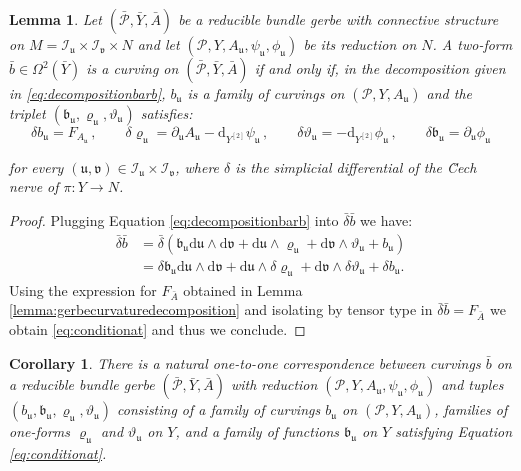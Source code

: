 \documentclass[10pt,a4paper,twoside,reqno]{amsart}
\theoremstyle{plain}
\newtheorem{lemma}[thm]{Lemma}
\newtheorem{cor}[thm]{Corollary}
\theoremstyle{definition}
\theoremstyle{remark}
\def\dd{\mathrm{d}}
\def\cI{\mathcal{I}}
\def\cP{\mathcal{P}}
\def\cP{\mathcal{P}}
\def\dd{\mathrm{d}}
\def\fru{\mathfrak{u}}
\def\frv{\mathfrak{v}}
\begin{document}
\begin{lemma}
\label{lemma:reduciblegerbe}
Let $(\bar{\cP},\bar{Y},\bar{A})$ be a reducible bundle gerbe with connective structure on $M = \cI_{\fru}\times \cI_{\frv} \times N$ and let  $(\cP,Y,A_{\fru} , \psi_{\fru} , \phi_{\fru})$ be its reduction on $N$. A two-form $\bar{b}\in \Omega^2(\bar{Y})$ is a curving on $(\bar{\cP},\bar{Y},\bar{A})$ if and only if, in the decomposition given in \eqref{eq:decompositionbarb}, $b_{\fru}$ is a family of curvings on $(\cP,Y,A_{\fru})$ and the triplet $(\mathfrak{b}_{\fru}, \varrho_{\fru}, \vartheta_{\fru})$  satisfies:
\begin{equation}
\label{eq:conditionat}
\delta b_{\fru} = F_{A_{\fru}}\, , \qquad \delta \varrho_{\fru} = \partial_{\fru} A_{\fru} - \dd_{Y^{[2]}} \psi_{\fru}\, , \qquad \delta \vartheta_{\fru} = - \dd_{Y^{[2]}}\phi_{\fru}\, , \qquad  \delta \mathfrak{b}_{\fru} =  \partial_{\fru} \phi_{\fru}
\end{equation}

\noindent
for every $(\fru , \frv)\in \cI_{\fru} \times \cI_{\frv}$, where $\delta$ is the simplicial differential of the \u{C}ech nerve of $\pi \colon Y \to N$.
\end{lemma}

\begin{proof}
Plugging Equation \eqref{eq:decompositionbarb} into $\bar{\delta}\bar{b}$ we have:
\begin{align*}
\bar{\delta}\bar{b} &= \bar{\delta}( \mathfrak{b}_{\fru} \dd \fru \wedge \dd \frv + \dd \fru \wedge \varrho_{\fru} + \dd \frv \wedge \vartheta_{\fru}   + b_{\fru}) \\
&= \delta\mathfrak{b}_{\fru} \dd \fru \wedge \dd \frv + \dd \fru \wedge \delta \varrho_{\fru} + \dd \frv \wedge \delta \vartheta_{\fru}   + \delta b_{\fru}.
\end{align*}
Using the expression for $F_{\bar{A}}$ obtained in Lemma \ref{lemma:gerbecurvaturedecomposition} and isolating by tensor type in $\bar{\delta}\bar{b}=F_{\bar{A}}$ we obtain \eqref{eq:conditionat} and thus we conclude.
\end{proof}

\begin{cor}
\label{cor:curvingreduction}
There is a natural one-to-one correspondence between curvings $\bar{b}$ on a reducible bundle gerbe $(\bar{\cP},\bar{Y},\bar{A})$ with reduction $(\cP,Y,A_{\fru} , \psi_{\fru} , \phi_{\fru})$ and tuples $(b_{\fru}, \mathfrak{b}_{\fru}, \varrho_{\fru}, \vartheta_{\fru})$ consisting of a family of curvings $b_{\fru}$ on $(\cP,Y,A_{\fru})$, families of one-forms $\varrho_{\fru}$ and $\vartheta_{\fru}$ on $Y$, and a family of functions $\mathfrak{b}_{\fru}$ on $Y$ satisfying Equation \eqref{eq:conditionat}.
\end{cor}
\end{document}
